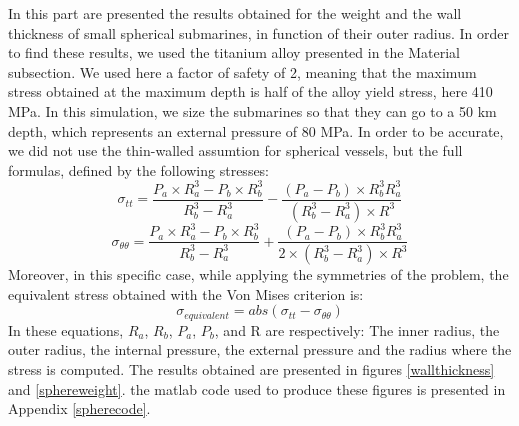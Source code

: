 In this part are presented the results obtained for the weight and the wall thickness of small spherical submarines, in function of their outer radius. In order to find these results, we used the titanium alloy presented in the Material subsection. We used here a factor of safety of 2, meaning that the maximum stress obtained at the maximum depth is half of the alloy yield stress, here 410 MPa. In this simulation, we size the submarines so that they can go to a 50 km depth, which represents an external pressure of 80 MPa. In order to be accurate, we did not use the thin-walled assumtion for spherical vessels, but the full formulas, defined by the following stresses:
\begin{equation}
\sigma_{tt}=\frac{P_{a}\times R_{a}^{3}-P_{b}\times R_{b}^{3}}{R_{b}^{3}-R_{a}^{3}}-\frac{(P_{a}-P_{b}) \times R_{b}^{3} R_{a}^{3}}{(R_{b}^{3}-R_{a}^{3}) \times R^{3}}
\end{equation}
\begin{equation}
\sigma_{\theta\theta}=\frac{P_{a}\times R_{a}^{3}-P_{b}\times R_{b}^{3}}{R_{b}^{3}-R_{a}^{3}}+\frac{(P_{a}-P_{b}) \times R_{b}^{3} R_{a}^{3}}{2 \times (R_{b}^{3}-R_{a}^{3}) \times R^{3}}
\end{equation}
Moreover, in this specific case, while applying the symmetries of the problem, the equivalent stress obtained with the Von Mises criterion is:
\begin{equation}
\sigma_{equivalent}= abs(\sigma_{tt}-\sigma_{\theta\theta})
\end{equation}
In these equations, $R_{a}$, $R_{b}$, $P_{a}$, $P_{b}$, and R are respectively: The inner radius, the outer radius, the internal pressure, the external pressure and the radius where the stress is computed. The results obtained are presented in figures \ref{wallthickness} and \ref{sphereweight}. the matlab code used to produce these figures is presented in Appendix \ref{spherecode}.

